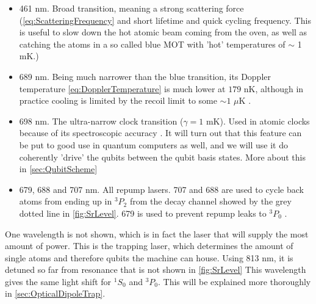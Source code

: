 \begin{itemize}
	\item 461 nm. Broad transition, meaning a strong scattering force (\cref{eq:ScatteringFrequency} and short lifetime and quick cycling frequency. This is useful to slow down the hot atomic beam coming from the oven, as well as catching the atoms in a so called blue \ac{MOT} with 'hot' temperatures of $\sim$ 1 mK.)
	
	\item 689 nm. Being much narrower than the blue transition, its Doppler temperature \cref{eq:DopplerTemperature} is much lower at $179$ nK, although in practice cooling is limited by the recoil limit to some $\sim 1$ $\mu$K \cite{Boyd2007,Stellmer2013}.
	
	\item 698 nm. The ultra-narrow clock transition ($\gamma = 1$ mK). Used in atomic clocks because of its spectroscopic accuracy \cite{Bloom2014}. It will turn out that this feature can be put to good use in quantum computers as well, and we will use it do coherently 'drive' the qubits between the qubit basis states. More about this in \cref{sec:QubitScheme}
	
	\item 679, 688 and 707 nm. All repump lasers. 707 and 688 are used to cycle back atoms from ending up in ${}^3P_2$ from the decay channel showed by the grey dotted line in \cref{fig:SrLevel}. 679 is used to prevent repump leaks to ${}^3P_0$ \cite{Stellmer2013,Xu2003}.
\end{itemize}

One wavelength is not shown, which is in fact the laser that will supply the most amount of power. This is the trapping laser, which determines the amount of single atoms and therefore qubits the machine can house. Using 813 nm, it is detuned so far from resonance that is not shown in \cref{fig:SrLevel} This wavelength gives the same light shift for ${}^1S_0$ and ${}^3 P_0$. This will be explained more thoroughly in \cref{sec:OpticalDipoleTrap}. 

